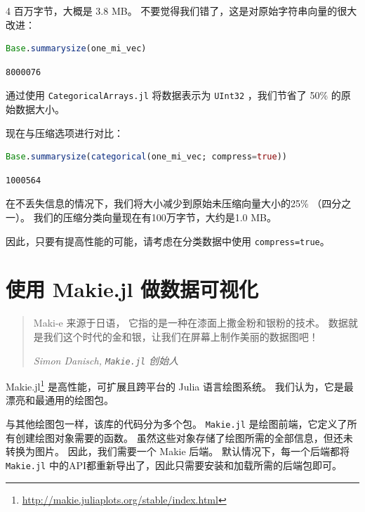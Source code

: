 \documentclass[
  notoc %
]{tufte-book}
\DeclareRobustCommand{\href}[2]{#2\footnote{\url{#1}}}
\newcommand{\passthrough}[1]{#1}
\begin{document}
4 百万字节，大概是 3.8 MB。
不要觉得我们错了，这是对原始字符串向量的很大改进：

\begin{lstlisting}[language=Julia]
Base.summarysize(one_mi_vec)
\end{lstlisting}

\begin{lstlisting}
8000076
\end{lstlisting}

通过使用 \passthrough{\lstinline!CategoricalArrays.jl!} 将数据表示为
\passthrough{\lstinline!UInt32!} ，我们节省了 50\% 的原始数据大小。

现在与压缩选项进行对比：

\begin{lstlisting}[language=Julia]
Base.summarysize(categorical(one_mi_vec; compress=true))
\end{lstlisting}

\begin{lstlisting}
1000564
\end{lstlisting}

在不丢失信息的情况下，我们将大小减少到原始未压缩向量大小的25\%
（四分之一）。 我们的压缩分类向量现在有100万字节，大约是1.0 MB。

因此，只要有提高性能的可能，请考虑在分类数据中使用
\passthrough{\lstinline!compress=true!}。

\hypertarget{sec:DataVisualizationMakie}{%
\chapter{使用 Makie.jl 做数据可视化}\label{sec:DataVisualizationMakie}}

\begin{quote}
Maki-e 来源于日语， 它指的是一种在漆面上撒金粉和银粉的技术。
数据就是我们这个时代的金和银，让我们在屏幕上制作美丽的数据图吧！

\emph{Simon Danisch, \passthrough{\lstinline!Makie.jl!} 创始人}
\end{quote}

\href{http://makie.juliaplots.org/stable/index.html}{Makie.jl}
是高性能，可扩展且跨平台的 Julia 语言绘图系统。
我们认为，它是最漂亮和最通用的绘图包。

与其他绘图包一样，该库的代码分为多个包。
\passthrough{\lstinline!Makie.jl!}
是绘图前端，它定义了所有创建绘图对象需要的函数。
虽然这些对象存储了绘图所需的全部信息，但还未转换为图片。
因此，我们需要一个 Makie 后端。 默认情况下，每一个后端都将
\passthrough{\lstinline!Makie.jl!}
中的API都重新导出了，因此只需要安装和加载所需的后端包即可。
\end{document}
